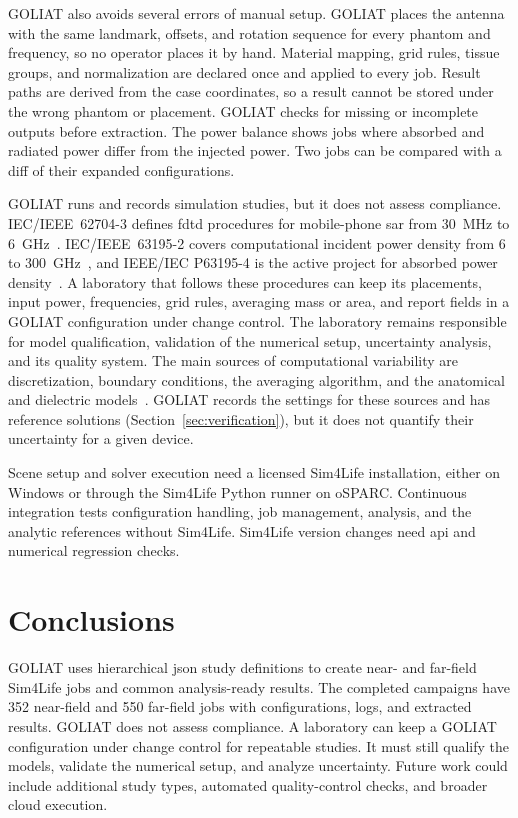 \documentclass[final,5p,times,twocolumn]{elsarticle}
\begin{document}
GOLIAT also avoids several errors of manual setup. GOLIAT places the antenna with the same landmark, offsets, and rotation sequence for every phantom and frequency, so no operator places it by hand. Material mapping, grid rules, tissue groups, and normalization are declared once and applied to every job. Result paths are derived from the case coordinates, so a result cannot be stored under the wrong phantom or placement. GOLIAT checks for missing or incomplete outputs before extraction. The power balance shows jobs where absorbed and radiated power differ from the injected power. Two jobs can be compared with a diff of their expanded configurations.

GOLIAT runs and records simulation studies, but it does not assess compliance. IEC/IEEE~62704-3 defines \gls{fdtd} procedures for mobile-phone \gls{sar} from 30~MHz to 6~GHz~\cite{IEC627043}. IEC/IEEE~63195-2 covers computational incident power density from 6 to 300~GHz~\cite{IEC631952}, and IEEE/IEC P63195-4 is the active project for absorbed power density~\cite{IEEEP631954}. A laboratory that follows these procedures can keep its placements, input power, frequencies, grid rules, averaging mass or area, and report fields in a GOLIAT configuration under change control. The laboratory remains responsible for model qualification, validation of the numerical setup, uncertainty analysis, and its quality system. The main sources of computational variability are discretization, boundary conditions, the averaging algorithm, and the anatomical and dielectric models~\cite{Hirata2026}. GOLIAT records the settings for these sources and has reference solutions (Section~\ref{sec:verification}), but it does not quantify their uncertainty for a given device.

Scene setup and solver execution need a licensed Sim4Life installation, either on Windows or through the Sim4Life Python runner on oSPARC. Continuous integration tests configuration handling, job management, analysis, and the analytic references without Sim4Life. Sim4Life version changes need \gls{api} and numerical regression checks.

\section{Conclusions}

GOLIAT uses hierarchical \gls{json} study definitions to create near- and far-field Sim4Life jobs and common analysis-ready results. The completed campaigns have 352 near-field and 550 far-field jobs with configurations, logs, and extracted results. GOLIAT does not assess compliance. A laboratory can keep a GOLIAT configuration under change control for repeatable studies. It must still qualify the models, validate the numerical setup, and analyze uncertainty. Future work could include additional study types, automated quality-control checks, and broader cloud execution.
\end{document}
